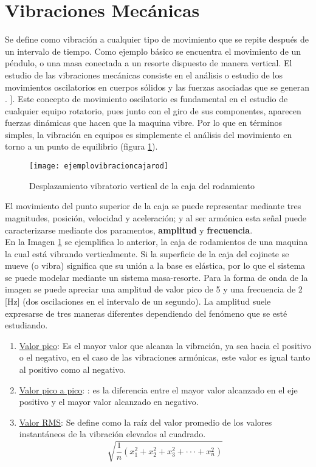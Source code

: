 	\section{Vibraciones Mecánicas}
		Se define como vibración a cualquier tipo de movimiento que se repite después de un intervalo de tiempo. Como ejemplo básico se encuentra el movimiento de un péndulo, o una masa conectada a un resorte dispuesto de manera vertical. El estudio de las vibraciones mecánicas consiste en el análisis o estudio de los movimientos oscilatorios en cuerpos sólidos y las fuerzas asociadas que se generan \cite{rao2011mechanical}. ]. Este concepto de movimiento oscilatorio es fundamental en el estudio de cualquier equipo rotatorio, pues junto con el giro de sus componentes, aparecen fuerzas dinámicas que hacen que la maquina vibre. Por lo que en términos simples, la vibración en equipos es simplemente el análisis del movimiento en torno a un punto de equilibrio (figura \ref{fig:ejvibracionrod}). \\
		\begin{figure}[t]
			\centering
			\texttt{[image: ejemplovibracioncajarod]}
			\caption{Desplazamiento vibratorio vertical de la caja del rodamiento}
			\label{fig:ejvibracionrod}
		\end{figure}
			
		El movimiento del punto superior de la caja se puede representar mediante tres magnitudes, posición, velocidad y aceleración; y al ser armónica esta señal puede caracterizarse mediante dos paramentos, \textbf{amplitud} y \textbf{frecuencia}. \\
			
		En la Imagen \ref{fig:ejvibracionrod} se ejemplifica lo anterior, la caja de rodamientos de una maquina la cual está vibrando verticalmente. Si la superficie de la caja del cojinete se mueve (o vibra) significa que su unión a la base es elástica, por lo que el sistema se puede modelar mediante un sistema masa-resorte. Para la forma de onda de la imagen se puede apreciar una amplitud de valor pico de 5 y una frecuencia de 2 [Hz] (dos oscilaciones en el intervalo de un segundo). La amplitud suele expresarse de tres maneras diferentes dependiendo del fenómeno que se esté estudiando.
		\begin{enumerate}
			\item  \underline{Valor pico}: Es el mayor valor que alcanza la vibración, ya sea hacia el positivo o el negativo, en el caso de las vibraciones armónicas, este valor es igual tanto al positivo como al negativo.
			\item \underline{Valor pico a pico}: : es la diferencia entre el mayor valor alcanzado en el eje positivo y el mayor valor alcanzado en negativo.
			\item \underline{Valor RMS}: Se define como la raíz del valor promedio de los valores instantáneos de la vibración elevados al cuadrado.
			\begin{equation}
			\sqrt{\frac{1}{n}(x_1^{2}+x_2^{2}+x_3^{2}+\cdot\cdot\cdot+x_n^{2})}
			\end{equation}
		\end{enumerate}
